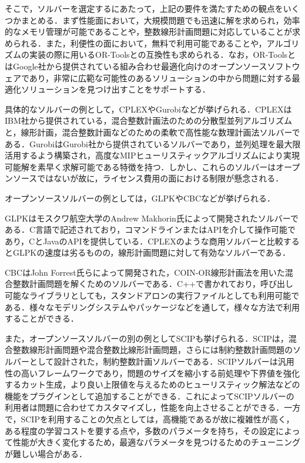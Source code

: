           \par そこで，ソルバーを選定するにあたって，上記の要件を満たすための観点をいくつかまとめる．まず性能面において，大規模問題でも迅速に解を求められ，効率的なメモリ管理が可能であることや，整数線形計画問題に対応していることが求められる．また，利便性の面において，無料で利用可能であることや，アルゴリズムの実装の際に用いるOR-Toolsとの互換性も求められる．なお，OR-ToolsとはGoogle社から提供されている組み合わせ最適化向けのオープンソースソフトウェアであり，非常に広範な可能性のあるソリューションの中から問題に対する最適化ソリューションを見つけ出すことをサポートする．
          
          \par 具体的なソルバーの例として，CPLEXやGurobiなどが挙げられる．CPLEXはIBM社から提供されている，混合整数計画法のための分散型並列アルゴリズムと，線形計画，混合整数計画などのための柔軟で高性能な数理計画法ソルバーである．GurobiはGurobi社から提供されているソルバーであり，並列処理を最大限活用するよう構築され，高度なMIPヒューリスティックアルゴリズムにより実現可能解を素早く求解可能である特徴を持つ．しかし、これらのソルバーはオープンソースではないが故に，ライセンス費用の面における制限が懸念される．
          
          \par オープンソースソルバーの例としては，GLPKやCBCなどが挙げられる．
          
          \par GLPKはモスクワ航空大学のAndrew Makhorin氏によって開発されたソルバーである．C言語で記述されており，コマンドラインまたはAPIを介して操作可能であり，CとJavaのAPIを提供している．CPLEXのような商用ソルバーと比較するとGLPKの速度は劣るものの，線形計画問題に対して有効なソルバーである．
          
          \par CBCはJohn Forrest氏らによって開発された，COIN-OR線形計画法を用いた混合整数計画問題を解くためのソルバーである．C++で書かれており，呼び出し可能なライブラリとしても，スタンドアロンの実行ファイルとしても利用可能である．様々なモデリングシステムやパッケージなどを通して，様々な方法で利用することができる．
          
          \par また，オープンソースソルバーの別の例としてSCIPも挙げられる．SCIPは，混合整数線形計画問題や混合整数比線形計画問題，さらには制約整数計画問題のソルバーとして設計された，制約整数計画ソルバーである．SCIPソルバーは汎用性の高いフレームワークであり，問題のサイズを縮小する前処理や下界値を強化するカット生成，より良い上限値を与えるためのヒューリスティック解法などの機能をプラグインとして追加することができる．これによってSCIPソルバーの利用者は問題に合わせてカスタマイズし，性能を向上させることができる．一方で，SCIPを利用することの欠点としては，高機能であるが故に複雑性が高く，ある程度の学習コストを要する点や，多数のパラメータを持ち，その設定によって性能が大きく変化するため，最適なパラメータを見つけるためのチューニングが難しい場合がある．
          
